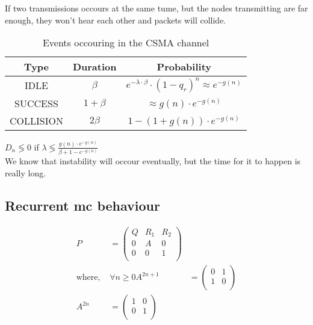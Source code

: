If two transmissions occours at the same tume, but the nodes transmitting are far
 enough, they won't hear each other and packets will collide.
 \begin{table}[h!]
\centering
\begin{tabular}{|c|c|c|}
\textbf{Type} & \textbf{Duration} & \textbf{Probability}                                         \\ \hline
IDLE          & $\beta$           & $e^{-\lambda \cdot \beta} \cdot (1-q_r)^n \approx e^{-g(n)}$ \\
SUCCESS       & $1+\beta$         & $\approx g(n) \cdot e^{-g(n)}$                               \\
COLLISION     & $2 \beta$         & $1-(1+g(n))\cdot e^{-g(n)}$
\end{tabular}
\caption{Events occouring in the CSMA channel}
\label{TAB:tx_prob}
\end{table}
$D_n \lessgtr 0 $ if $\lambda \lessgtr \frac{g(n) \cdot e^{-g(n)}}{\beta + 1 - e^{-g(n)}}$\\
We know that instability will occour eventually, but the time for it to happen is really long.

\subsection{Recurrent \gls{mc} behaviour}
\begin{figure}
  
  \caption{}
  \label{}
\end{figure}

\begin{equation}\begin{split}
  P&=\begin{pmatrix}
      Q & R_1 & R_2 \\
      0 & A   & 0 \\
      0 & 0   & 1 \\
  \end{pmatrix}\\
  \text{where, }&\forall n\ge 0
  A^{2n+1}&=\begin{pmatrix}
      0 & 1 \\
      1 & 0 \\
  \end{pmatrix}\\
  A^{2n}&=\begin{pmatrix}
      1 & 0 \\
      0 & 1 \\
  \end{pmatrix}\\
\end{split}\end{equation}

